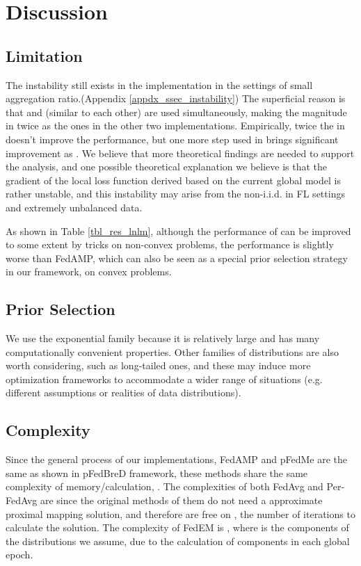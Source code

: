 \documentclass{article}
\begin{document}
\section{Discussion}
\label{sec_disc}

\subsection{Limitation}
\label{ssec_limitation}

The instability still exists in the implementation  in the settings of small aggregation ratio.(Appendix \ref{appdx_ssec_instability}) The superficial reason is that  and  (similar to each other) are used simultaneously, making the magnitude in  twice as the ones in the other two implementations. Empirically, twice the  in  doesn’t improve the performance, but one more  step used in  brings significant improvement as . We believe that more theoretical findings are needed to support the analysis, and one possible theoretical explanation we believe is that the gradient of the local loss function derived based on the current global model is rather unstable, and this instability may arise from the non-i.i.d. in FL settings and extremely unbalanced data.

As shown in Table \ref{tbl_res_lnlm}, although the performance of  can be improved to some extent by tricks on non-convex problems, the performance is slightly worse than FedAMP, which can also be seen as a special prior selection strategy in our framework, on convex problems.\cite{huang2021personalized}



\subsection{Prior Selection}
We use the exponential family because it is relatively large and has many computationally convenient properties. Other families of distributions are also worth considering, such as long-tailed ones, and these may induce more optimization frameworks to accommodate a wider range of situations (e.g. different assumptions or realities of data distributions).

\subsection{Complexity}

Since the general process of our implementations, FedAMP and pFedMe are the same as shown in pFedBreD framework, these methods share the same complexity of memory/calculation, .
The complexities of both FedAvg and Per-FedAvg are  since the original methods of them do not need a approximate proximal mapping solution, and therefore are free on , the number of iterations to calculate the solution.
The complexity of FedEM is , where  is the components of the distributions we assume, due to the calculation of  components in each global epoch.
\end{document}
